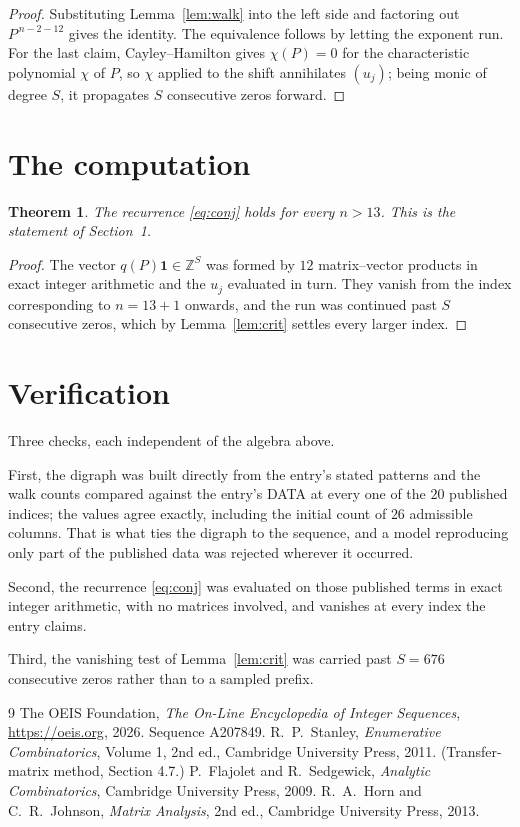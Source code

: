 \documentclass[11pt,a4paper]{article}
\theoremstyle{plain}
\newtheorem{theorem}{Theorem}
\theoremstyle{definition}
\begin{document}
\begin{proof}
Substituting Lemma~\ref{lem:walk} into the left side and factoring out
$P^{\,n-2-12}$ gives the identity. The equivalence follows by letting the exponent
run. For the last claim, Cayley--Hamilton gives $\chi(P)=0$ for the characteristic
polynomial $\chi$ of $P$, so $\chi$ applied to the shift annihilates $(u_j)$; being monic of
degree $S$, it propagates $S$ consecutive zeros forward.
\end{proof}

\section{The computation}

\begin{theorem}
The recurrence \eqref{eq:conj} holds for every $n>13$. This is the statement of
Section~1.
\end{theorem}

\begin{proof}
The vector $q(P)\mathbf{1}\in\mathbb{Z}^{S}$ was formed by $12$ matrix--vector
products in exact integer arithmetic and the $u_j$ evaluated in turn. They vanish from the
index corresponding to $n=13+1$ onwards, and the run was continued past $S$ consecutive
zeros, which by Lemma~\ref{lem:crit} settles every larger index.
\end{proof}

\section{Verification}

Three checks, each independent of the algebra above.

First, the digraph was built directly from the entry's stated patterns and the walk counts
compared against the entry's DATA at every one of the $20$ published indices; the
values agree exactly, including the initial count of $26$ admissible columns. That is
what ties the digraph to the sequence, and a model reproducing only part of the published
data was rejected wherever it occurred.

Second, the recurrence \eqref{eq:conj} was evaluated on those published terms in exact
integer arithmetic, with no matrices involved, and vanishes at every index the entry claims.

Third, the vanishing test of Lemma~\ref{lem:crit} was carried past $S=676$ consecutive
zeros rather than to a sampled prefix.

\begin{thebibliography}{9}
 The OEIS Foundation, \emph{The On-Line Encyclopedia of Integer
Sequences}, \url{https://oeis.org}, 2026. Sequence A207849.
 R.~P.~Stanley, \emph{Enumerative Combinatorics}, Volume 1, 2nd ed.,
Cambridge University Press, 2011. (Transfer-matrix method, Section 4.7.)
 P.~Flajolet and R.~Sedgewick, \emph{Analytic Combinatorics}, Cambridge
University Press, 2009.
 R.~A.~Horn and C.~R.~Johnson, \emph{Matrix Analysis}, 2nd ed., Cambridge
University Press, 2013.
\end{thebibliography}
\end{document}
